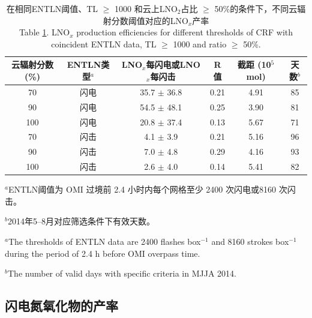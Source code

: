 \begin{table}[H]
\caption{在相同ENTLN阈值、TL $\geq$ 1000 和云上LNO$_2$占比 $\geq$ 50\%的条件下，不同云辐射分数阈值对应的LNO$_x$产率 \\
Table \ref{table:CRFs}. LNO$_x$ production efficiencies for different thresholds of CRF with coincident ENTLN data, TL $\geq$ 1000 and ratio $\geq$ 50\%.}
\footnotesize
\begin{tabular}{cccccc}
\hline
云辐射分数 (\%) & ENTLN类型$^a$    & LNO$_x$每闪电或LNO$_x$每闪击
& R值    & 截距 (10$^{5}$mol)  & 天数$^b$ \\
\hline
70  & 闪电  & 35.7  $\pm$ 36.8 & 0.21 & 4.91 & 85 \\
90  & 闪电  & 54.5  $\pm$ 48.1 & 0.25 & 3.90 & 81 \\
100 & 闪电  & 20.8  $\pm$ 37.4 & 0.13 & 5.67 & 71 \\
70  & 闪击 & 4.1   $\pm$ 3.9  & 0.21 & 5.16 & 96 \\
90  & 闪击 & 7.0   $\pm$ 4.8  & 0.29 & 4.16 & 93 \\
100 & 闪击 & 2.6   $\pm$ 4.0  & 0.14 & 5.41 & 82 \\
\hline
\end{tabular}
\begin{tablenotes}
\linespread{1}\footnotesize
\item $^a$ENTLN阈值为 OMI 过境前 2.4 小时内每个网格至少 2400 次闪电或8160 次闪击。
\item $^b$2014年5--8月对应筛选条件下有效天数。
\item $^a$The thresholds of ENTLN data are 2400 flashes box$^{-1}$ and 8160 strokes box$^{-1}$ during the period of 2.4 h before OMI overpass time.
\item $^b$The number of valid days with specific criteria in MJJA 2014.
\end{tablenotes}
\label{table:CRFs}
\end{table}

\subsection{闪电氮氧化物的产率}

